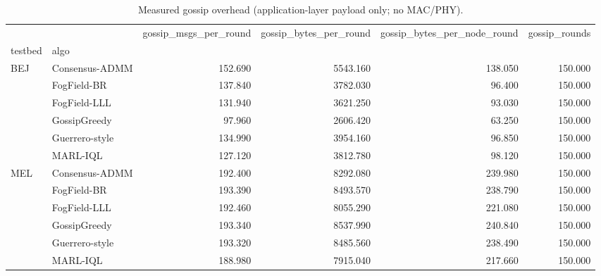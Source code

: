 \begin{table}
\caption{Measured gossip overhead (application-layer payload only; no MAC/PHY).}
\label{tab:table6_overhead}
\begin{tabular}{llrrrr}
\toprule
 &  & gossip\_msgs\_per\_round & gossip\_bytes\_per\_round & gossip\_bytes\_per\_node\_round & gossip\_rounds \\
testbed & algo &  &  &  &  \\
\midrule
\multirow[t]{6}{*}{BEJ} & Consensus-ADMM & 152.690 & 5543.160 & 138.050 & 150.000 \\
 & FogField-BR & 137.840 & 3782.030 & 96.400 & 150.000 \\
 & FogField-LLL & 131.940 & 3621.250 & 93.030 & 150.000 \\
 & GossipGreedy & 97.960 & 2606.420 & 63.250 & 150.000 \\
 & Guerrero-style & 134.990 & 3954.160 & 96.850 & 150.000 \\
 & MARL-IQL & 127.120 & 3812.780 & 98.120 & 150.000 \\
\cline{1-6}
\multirow[t]{6}{*}{MEL} & Consensus-ADMM & 192.400 & 8292.080 & 239.980 & 150.000 \\
 & FogField-BR & 193.390 & 8493.570 & 238.790 & 150.000 \\
 & FogField-LLL & 192.460 & 8055.290 & 221.080 & 150.000 \\
 & GossipGreedy & 193.340 & 8537.990 & 240.840 & 150.000 \\
 & Guerrero-style & 193.320 & 8485.560 & 238.490 & 150.000 \\
 & MARL-IQL & 188.980 & 7915.040 & 217.660 & 150.000 \\
\cline{1-6}
\bottomrule
\end{tabular}
\end{table}
